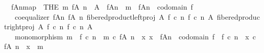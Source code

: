 \begin{isabellebody}
\ \ {\isachardoublequoteopen}{\isacharbrackleft}{\kern0pt}f{\isasymlparr}A{\isasymrparr}\isactrlbsub n\isactrlesub {\isacharbrackright}{\kern0pt}map\ {\isacharequal}{\kern0pt}\ {\isacharparenleft}{\kern0pt}THE\ m{\isachardot}{\kern0pt}\ f{\isasymrestriction}\isactrlbsub {\isacharparenleft}{\kern0pt}A{\isacharcomma}{\kern0pt}\ n{\isacharparenright}{\kern0pt}\isactrlesub \ {\isacharcolon}{\kern0pt}\ A\ {\isasymrightarrow}\ f{\isasymlparr}A{\isasymrparr}\isactrlbsub n\isactrlesub \ {\isasymand}\ m\ {\isacharcolon}{\kern0pt}\ f{\isasymlparr}A{\isasymrparr}\isactrlbsub n\isactrlesub \ {\isasymrightarrow}\ codomain\ f\ {\isasymand}\isanewline
\ \ \ coequalizer\ {\isacharparenleft}{\kern0pt}f{\isasymlparr}A{\isasymrparr}\isactrlbsub n\isactrlesub {\isacharparenright}{\kern0pt}\ {\isacharparenleft}{\kern0pt}f{\isasymrestriction}\isactrlbsub {\isacharparenleft}{\kern0pt}A{\isacharcomma}{\kern0pt}\ n{\isacharparenright}{\kern0pt}\isactrlesub {\isacharparenright}{\kern0pt}\ {\isacharparenleft}{\kern0pt}fibered{\isacharunderscore}{\kern0pt}product{\isacharunderscore}{\kern0pt}left{\isacharunderscore}{\kern0pt}proj\ A\ {\isacharparenleft}{\kern0pt}f\ {\isasymcirc}\isactrlsub c\ n{\isacharparenright}{\kern0pt}\ {\isacharparenleft}{\kern0pt}f\ {\isasymcirc}\isactrlsub c\ n{\isacharparenright}{\kern0pt}\ A{\isacharparenright}{\kern0pt}\ {\isacharparenleft}{\kern0pt}fibered{\isacharunderscore}{\kern0pt}product{\isacharunderscore}{\kern0pt}right{\isacharunderscore}{\kern0pt}proj\ A\ {\isacharparenleft}{\kern0pt}f\ {\isasymcirc}\isactrlsub c\ n{\isacharparenright}{\kern0pt}\ {\isacharparenleft}{\kern0pt}f\ {\isasymcirc}\isactrlsub c\ n{\isacharparenright}{\kern0pt}\ A{\isacharparenright}{\kern0pt}\ {\isasymand}\isanewline
\ \ \ monomorphism\ m\ {\isasymand}\ f\ {\isasymcirc}\isactrlsub c\ n\ {\isacharequal}{\kern0pt}\ m\ {\isasymcirc}\isactrlsub c\ {\isacharparenleft}{\kern0pt}f{\isasymrestriction}\isactrlbsub {\isacharparenleft}{\kern0pt}A{\isacharcomma}{\kern0pt}\ n{\isacharparenright}{\kern0pt}\isactrlesub {\isacharparenright}{\kern0pt}\ {\isasymand}\ {\isacharparenleft}{\kern0pt}{\isasymforall}x{\isachardot}{\kern0pt}\ x\ {\isacharcolon}{\kern0pt}\ {\isacharparenleft}{\kern0pt}f{\isasymlparr}A{\isasymrparr}\isactrlbsub n\isactrlesub {\isacharparenright}{\kern0pt}\ {\isasymrightarrow}\ codomain\ f\ {\isasymlongrightarrow}\ f\ {\isasymcirc}\isactrlsub c\ n\ {\isacharequal}{\kern0pt}\ x\ {\isasymcirc}\isactrlsub c\ {\isacharparenleft}{\kern0pt}f{\isasymrestriction}\isactrlbsub {\isacharparenleft}{\kern0pt}A{\isacharcomma}{\kern0pt}\ n{\isacharparenright}{\kern0pt}\isactrlesub {\isacharparenright}{\kern0pt}\ {\isasymlongrightarrow}\ x\ {\isacharequal}{\kern0pt}\ m{\isacharparenright}{\kern0pt}{\isacharparenright}{\kern0pt}{\isachardoublequoteclose}\isanewline

\end{isabellebody}
